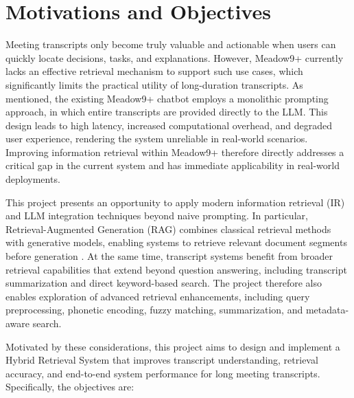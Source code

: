 \section{Motivations and Objectives}
Meeting transcripts only become truly valuable and actionable when users can quickly locate decisions, tasks, and explanations. However, Meadow9+ currently lacks an effective retrieval mechanism to support such use cases, which significantly limits the practical utility of long-duration transcripts. As mentioned, the existing Meadow9+ chatbot employs a monolithic prompting approach, in which entire transcripts are provided directly to the LLM. This design leads to high latency, increased computational overhead, and degraded user experience, rendering the system unreliable in real-world scenarios. Improving information retrieval within Meadow9+ therefore directly addresses a critical gap in the current system and has immediate applicability in real-world deployments.

This project presents an opportunity to apply modern information retrieval (IR) and LLM integration techniques beyond naive prompting. In particular, Retrieval-Augmented Generation (RAG) combines classical retrieval methods with generative models, enabling systems to retrieve relevant document segments before generation \cite{fan2024survey}. At the same time, transcript systems benefit from broader retrieval capabilities that extend beyond question answering, including transcript summarization and direct keyword-based search. The project therefore also enables exploration of advanced retrieval enhancements, including query preprocessing, phonetic encoding, fuzzy matching, summarization, and metadata-aware search.

Motivated by these considerations, this project aims to design and implement a Hybrid Retrieval System that improves transcript understanding, retrieval accuracy, and end-to-end system performance for long meeting transcripts. Specifically, the objectives are:

